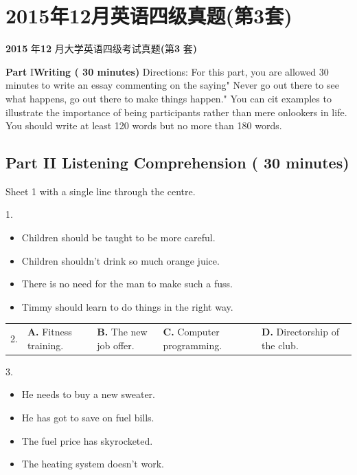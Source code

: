 \documentclass[UTF8,11pt]{ctexart}
\begin{document}
\section*{2015年12月英语四级真题(第3套)}
\textbf{2015} 年\textbf{12} 月大学英语四级考试真题\textbf{(}第\textbf{3} 套\textbf{)}


\textbf{Part} I\textbf{Writing ( 30 minutes)} Directions: For this part, you are allowed 30 minutes to write an essay commenting on the saying" Never go out there to see what happens, go out there to make things happen." You can cit examples to illustrate the importance of being participants rather than mere onlookers in life. You should write at least 120 words but no more than 180 words.


\subsection*{\textbf{Part II Listening Comprehension ( 30 minutes)}}


Sheet 1 with a single line through the centre.


1.


\begin{itemize}[leftmargin=2em,itemsep=.2em,topsep=.4em]\item[A.] Children should be taught to be more careful.
\item[B.] Children shouldn't drink so much orange juice.
\item[C.] There is no need for the man to make such a fuss.
\item[D.] Timmy should learn to do things in the right way.
\end{itemize}

\noindent\begin{tabularx}{\linewidth}{@{}lXXXX@{}}2. & \textbf{A.} Fitness training. & \textbf{B.} The new job offer. & \textbf{C.} Computer programming. & \textbf{D.} Directorship of the club.\\\end{tabularx}\par

3.


\begin{itemize}[leftmargin=2em,itemsep=.2em,topsep=.4em]\item[A.] He needs to buy a new sweater.
\item[B.] He has got to save on fuel bills.
\item[C.] The fuel price has skyrocketed.
\item[D.] The heating system doesn't work.
\end{itemize}
\end{document}
